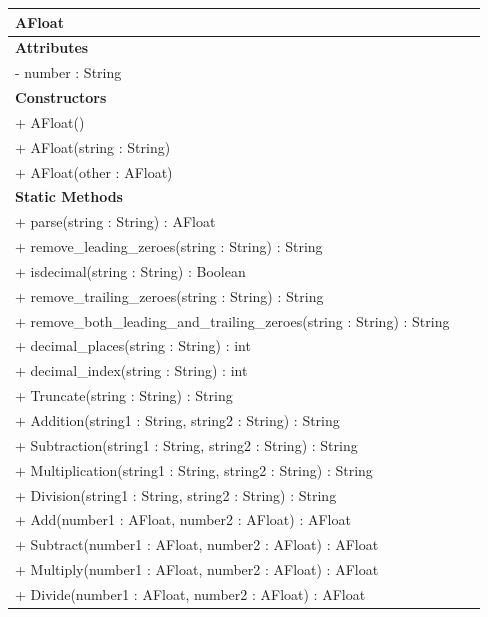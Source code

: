 \documentclass{article}
\begin{document}
\begin{center}
\begin{tabular}{|>{\raggedright\arraybackslash}p{0.95\linewidth}|}
\hline
\textbf{\large AFloat} \\
\hline
\textbf{Attributes} \\
\hline
- number : String \\
\hline
\textbf{Constructors} \\
\hline
+ AFloat() \\
+ AFloat(string : String) \\
+ AFloat(other : AFloat) \\
\hline
\textbf{Static Methods} \\
\hline
+ parse(string : String) : AFloat \\
+ remove\_leading\_zeroes(string : String) : String \\
+ isdecimal(string : String) : Boolean \\
+ remove\_trailing\_zeroes(string : String) : String \\
+ remove\_both\_leading\_and\_trailing\_zeroes(string : String) : String \\
+ decimal\_places(string : String) : int \\
+ decimal\_index(string : String) : int \\
+ Truncate(string : String) : String \\
+ Addition(string1 : String, string2 : String) : String \\
+ Subtraction(string1 : String, string2 : String) : String \\
+ Multiplication(string1 : String, string2 : String) : String \\
+ Division(string1 : String, string2 : String) : String \\
+ Add(number1 : AFloat, number2 : AFloat) : AFloat \\
+ Subtract(number1 : AFloat, number2 : AFloat) : AFloat \\
+ Multiply(number1 : AFloat, number2 : AFloat) : AFloat \\
+ Divide(number1 : AFloat, number2 : AFloat) : AFloat \\
\hline
\end{tabular}
\end{center}
\end{document}
